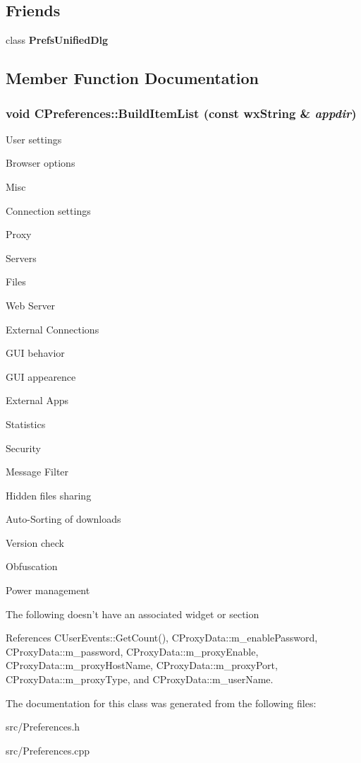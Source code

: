 \subsection*{Friends}
\begin{DoxyCompactItemize}
\item 
class {\bf PrefsUnifiedDlg}\label{classCPreferences_ac24ec000139eca6e3db54b6c0fa40c93}

\end{DoxyCompactItemize}


\subsection{Member Function Documentation}
\subsubsection[{BuildItemList}]{\setlength{\rightskip}{0pt plus 5cm}void CPreferences::BuildItemList (const wxString \& {\em appdir})\hspace{0.3cm}{\ttfamily  [static]}}\label{classCPreferences_a0fe6309372e27e872161a53cad50d665}


User settings

Browser options

Misc

Connection settings

Proxy

Servers

Files

Web Server

External Connections

GUI behavior

GUI appearence

External Apps

Statistics

Security

Message Filter

Hidden files sharing

Auto-\/Sorting of downloads

Version check

Obfuscation

Power management

The following doesn't have an associated widget or section

References CUserEvents::GetCount(), CProxyData::m\_\-enablePassword, CProxyData::m\_\-password, CProxyData::m\_\-proxyEnable, CProxyData::m\_\-proxyHostName, CProxyData::m\_\-proxyPort, CProxyData::m\_\-proxyType, and CProxyData::m\_\-userName.

The documentation for this class was generated from the following files:\begin{DoxyCompactItemize}
\item 
src/Preferences.h\item 
src/Preferences.cpp\end{DoxyCompactItemize}
